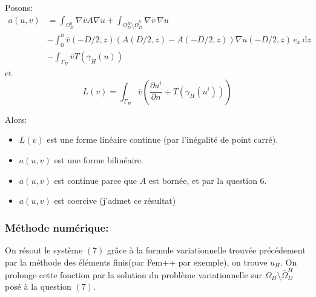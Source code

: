 \documentclass{article}
\begin{document}
Posons:
\begin{align*}
a(u, v) &= \int_{\Omega_D^h} \nabla \bar v A \nabla u + \int_{\Omega_D^H \setminus \bar \Omega_D^h } \nabla \bar v \, \nabla u \\
& - \int_0^h \bar v(-D/2, z) \left(A(D/2, z) - A(-D/2, z)\right) \nabla u(-D/2, z) \, e_x \, \mathrm{d}z\\
& - \int_{\Gamma_H} \bar v T(\gamma_H(u))
\end{align*}
et 
$$ L(v) = \int_{\Gamma_H} \bar v (\frac{\partial u^i}{\partial n}  + T(\gamma_H(u^i)))$$

Alors:
\begin{itemize}
	\item $L(v)$ est une forme linéaire continue (par l'inégalité de point carré).
	\item $a(u,v)$ est une forme bilinéaire.
	\item $a(u,v)$ est continue parce que $A$ est bornée, et par la question $6$.
	\item $a(u,v)$ est coercive (j'admet ce résultat)
\end{itemize}

\subsubsection*{Méthode numérique:}
On résout le système $(7)$ grâce à la formule variationnelle trouvée précédement par la méthode des éléments finis(par Fem++ par exemple), on trouve $u_H$. On prolonge cette fonction par la solution du problème variationnelle sur $\Omega_D \setminus \bar \Omega_D^H$ posé à la question $(7)$.
\end{document}

